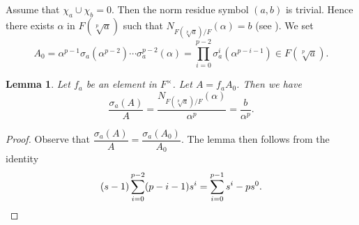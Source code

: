 \documentclass[12pt,leqno]{amsart}
\theoremstyle{plain}
\newtheorem{lem}[thm]{Lemma}
\theoremstyle{definition}
\newcommand*{\QEDB}{\hfill\ensuremath{\square}}
\begin{document}
Assume that $\chi_a\cup \chi_b=0$. Then the norm residue symbol $(a,b)$ is trivial. Hence there exists $\alpha$ in $F(\sqrt[p]{a})$ such that $N_{F(\sqrt[p]{a})/F}(\alpha)=b$ (see  \cite[Chapter XIV, Proposition 4 (iii)]{Se}). We set 
\[
A_0=\alpha^{p-1} \sigma_a(\alpha^{p-2})\cdots \sigma_a^{p-2}(\alpha)=\prod_{i=0}^{p-2} \sigma_a^{i}(\alpha^{p-i-1}) \in  F(\sqrt[p]{a}).
\]
\begin{lem} Let $f_a$ be an element in $F^\times$. Let $A=f_aA_0$. Then we have
\label{lem:operator}
\[
\frac{\sigma_a(A)}{A}=\frac{N_{F(\sqrt[p]{a})/F}(\alpha)}{\alpha^p}=\frac{b}{\alpha^p}.
\]
\end{lem}
\begin{proof}Observe that $\dfrac{\sigma_a(A)}{A}=\dfrac{\sigma_a(A_0)}{A_0}$.
The lemma then follows from the identity
\[
(s-1)\sum_{i=0}^{p-2} (p-i-1)s^{i} = \sum_{i=0}^{p-1} s^i -p s^0.
\qedhere
\]
\end{proof}
\end{document}
